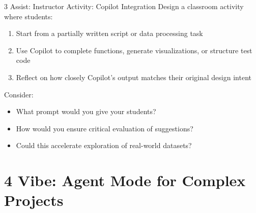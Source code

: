 \documentclass[xcolor=dvipsnames, aspectratio=169]{beamer}
\newcommand{\footername}{AI in Programming Education}
\newcommand{\setfooter}[2]{\renewcommand{\footername}{\href{#2}{#1}}}
\begin{document}
\begin{frame}{3 Assist: Instructor Activity: Copilot Integration}
  Design a classroom activity where students:
  \begin{enumerate}
    \item Start from a partially written script or data processing task
    \item Use Copilot to complete functions, generate visualizations, or structure test code
    \item Reflect on how closely Copilot's output matches their original design intent
  \end{enumerate}
  
  Consider:
  \begin{itemize}
    \item What prompt would you give your students?
    \item How would you ensure critical evaluation of suggestions?
    \item Could this accelerate exploration of real-world datasets?
  \end{itemize}
\end{frame}

\section{4 Vibe: Agent Mode for Complex Projects}
\setfooter{4 Vibe}{https://github.com/neu-ece-esl/ai-prog-workshop/tree/main/4-vibe}
\end{document}
